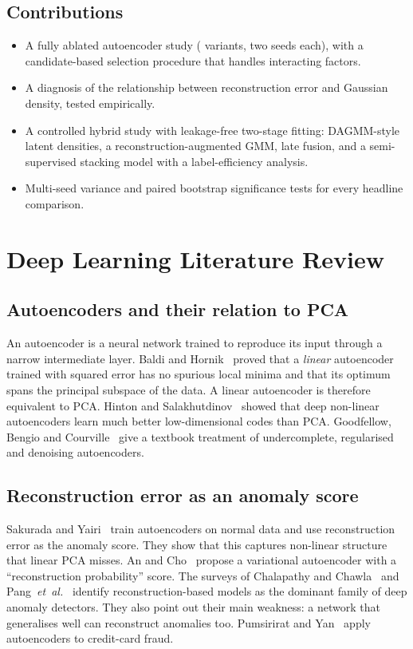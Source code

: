 \documentclass[12pt]{article}
\begin{document}
\subsection{Contributions}
\begin{itemize}
\item A fully ablated autoencoder study (\nAblations{} variants, two seeds each), with a candidate-based selection
procedure that handles interacting factors.
\item A diagnosis of the relationship between reconstruction error and Gaussian density, tested empirically.
\item A controlled hybrid study with leakage-free two-stage fitting: DAGMM-style latent densities, a
reconstruction-augmented GMM, late fusion, and a semi-supervised stacking model with a label-efficiency analysis.
\item Multi-seed variance and paired bootstrap significance tests for every headline comparison.
\end{itemize}

\section{Deep Learning Literature Review}\label{sec:lit}

\subsection{Autoencoders and their relation to PCA}
An autoencoder is a neural network trained to reproduce its input through a narrow intermediate layer. Baldi and
Hornik~\cite{baldi1989} proved that a \emph{linear} autoencoder trained with squared error has no spurious local
minima and that its optimum spans the principal subspace of the data. A linear autoencoder is therefore equivalent to
PCA. Hinton and Salakhutdinov~\cite{hinton2006} showed that deep non-linear autoencoders learn much better
low-dimensional codes than PCA. Goodfellow, Bengio and Courville~\cite{goodfellow2016} give a textbook treatment of
undercomplete, regularised and denoising autoencoders.

\subsection{Reconstruction error as an anomaly score}
Sakurada and Yairi~\cite{sakurada2014} train autoencoders on normal data and use reconstruction error as the anomaly
score. They show that this captures non-linear structure that linear PCA misses. An and Cho~\cite{an2015} propose a
variational autoencoder with a ``reconstruction probability'' score. The surveys of Chalapathy and
Chawla~\cite{chalapathy2019} and Pang~\emph{et~al.}~\cite{pang2021} identify reconstruction-based models as the dominant
family of deep anomaly detectors. They also point out their main weakness: a network that generalises well can
reconstruct anomalies too. Pumsirirat and Yan~\cite{pumsirirat2018} apply autoencoders to credit-card fraud.
\end{document}
